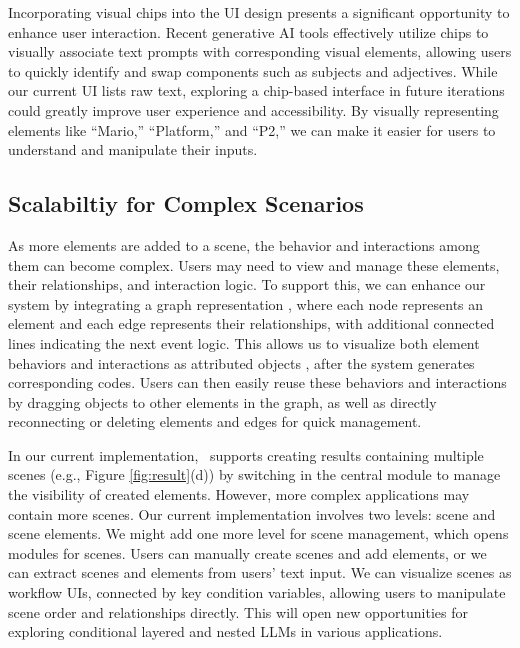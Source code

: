 {Incorporating visual chips into the UI design presents a significant opportunity to enhance user interaction. Recent generative AI tools \cite{wang2024promptcharm,li2024evaluating} effectively utilize chips to visually associate text prompts with corresponding visual elements, allowing users to quickly identify and swap components such as subjects and adjectives. While our current UI lists raw text, exploring a chip-based interface in future iterations could greatly improve user experience and accessibility. By visually representing elements like “Mario,” “Platform,” and “P2,” we can make it easier for users to understand and manipulate their inputs.

\subsection{Scalabiltiy for Complex Scenarios}
As more elements are added to a scene, the behavior and interactions among them can become complex. Users may need to view and manage these elements, their relationships, and interaction logic. To support this, we can enhance our system by integrating a graph representation \cite{yan2023xcreation}, where each node represents an element and each edge represents their relationships, with additional connected lines indicating the next event logic. This allows us to visualize both element behaviors and interactions as attributed objects \cite{xia2016object}, after the system generates corresponding codes. Users can then easily reuse these behaviors and interactions by dragging objects to other elements in the graph, as well as directly reconnecting or deleting elements and edges for quick management.

{In our current implementation,} 
\sysName~supports creating results containing multiple scenes (e.g., Figure \ref{fig:result}(d)) by switching in the central module to manage the visibility of created elements. However, more complex applications may contain more scenes. Our current implementation involves two levels: scene and scene elements. We might add one more level for scene management, which opens modules for scenes.
Users can manually create scenes and add elements, or we can extract scenes and elements from users' text input. 
We can visualize scenes as workflow UIs, connected by key condition variables, allowing users to manipulate scene order and relationships directly. This will open new opportunities for exploring conditional layered and nested LLMs in various applications.


}

